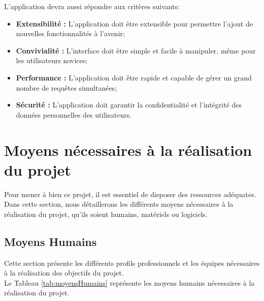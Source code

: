 \documentclass[12pt]{report}
\begin{document}
						L'application devra aussi répondre aux critères suivants:

						\begin{itemize}
							\item \textbf{Extensibilité :}  L'application doit être extensible pour permettre l'ajout de nouvelles fonctionnalités à l'avenir;
							\item \textbf{Convivialité :} L'interface doit être simple et facile à manipuler, même pour les utilisateurs novices;
							\item \textbf{Performance :} L'application doit être rapide et capable de gérer un grand nombre de requêtes simultanées;
							\item \textbf{Sécurité :} L'application doit garantir la confidentialité et l'intégrité des données personnelles des utilisateurs.
						\end{itemize}
								
				\section{Moyens nécessaires à la réalisation du projet}

				\hspace{15pt} Pour mener à bien ce projet, il est essentiel de disposer des ressources adéquates. Dans cette section, nous détaillerons les différents moyens nécessaires à la réalisation du projet, qu'ils soient humains, matériels ou logiciels.

				\subsection{Moyens Humains}

				\hspace{15pt} Cette section présente les différents profils professionnels et les équipes nécessaires à la réalisation des objectifs du projet.\\				

				Le Tableau \ref{tab:moyensHumains} représente les moyens humains nécessaires à la réalisation du projet.
\end{document}
